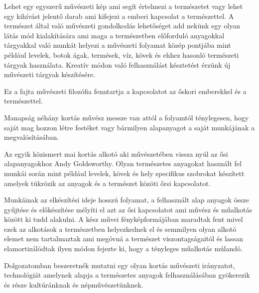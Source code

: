 \documentclass[fontsize=12pt, appendixprefix=true]{scrreprt}
\begin{document}
Lehet egy egyszerű művészeti kép ami segít értelmezi a természetet vagy lehet egy kihívást jelentő darab ami kifejezi a emberi kapcsolat a természettel.
A természet által való művészeti gondolkodás lehetőséget add nekünk egy olyan látás mód kialakítására ami maga a természetben előforduló anyagokkal tárgyakkal való munkát helyezi a művészeti folyamat közép pontjába mint például levelek, botok ágak, termések, víz, kövek és ehhez hasonló természeti tárgyak használata.
Kreatív módon való felhasználást késztetést érzünk új művészeti tárgyak készítésére.

Ez a fajta művészeti filozófia fenntartja a kapcsolatot az őskori emberekkel és a természettel.

Manapság néhány kortás művész messze van attól a folyamtól ténylegesen, hogy saját mag hozzon létre festéket vagy bármilyen alapanyagot a saját munkájának a megvalósításában.

Az egyik közismert mai kortás alkotó aki művészetében vissza nyúl az ősi alapanyagokhoz Andy Goldsworthy. Olyan természetes anyagokat használt fel munkái során mint például levelek, kövek és hely specifikus szobrokat készített amelyek tükrözik az anyagok és a természet közöti őrsi kapcsolatot.

Munkáinak az elkészítési ideje hosszú folyamat, a felhasznált alap anyagok össze gyűjtése és előkészítése mélyíti el azt az ősi kapcsolatot ami művész és műalkotás között ki tudd alakulni.
A kész művei fényképformájában maradtak fent mivel ezek az alkotások a természetben helyezkednek el és semmilyen olyan alkotó elemet nem tartalmaztak ami megóvná a természet viszontagságaitól és lassan elamortizálódtak ilyen módon fejezte ki, hogy a tényleges műalkotás múlandó.


Dolgozatomban beszeretnék mutatni egy olyan kortás művészeti irányzatot, technológiát amelynek alapja a természetes anyagok felhasználásában gyökerezik és része kultúránknak és népművészetünknek.

\end{document}
